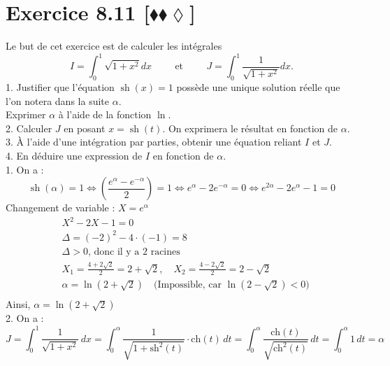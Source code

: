 \documentclass[10pt]{article}
\DeclareMathOperator{\sh}{sh}
\begin{document}
\section*{Exercice 8.11 [$\blacklozenge\blacklozenge\lozenge$]}
\begin{tcolorbox}[enhanced, width=7in, center, size=fbox, fontupper=\large, drop shadow southwest]
    Le but de cet exercice est de calculer les intégrales
    \begin{equation*}
        I = \int_0^1{\sqrt{1+x^2}dx} \hspace{1cm} \text{et} \hspace{1cm} J=\int_0^1{\frac{1}{\sqrt{1+x^2}}dx}.
    \end{equation*}
    1. Justifier que l'équation $\sh(x)=1$ possède une unique solution réelle que l'on notera dans la suite $\alpha$.\\
    Exprimer $\alpha$ à l'aide de la fonction $\ln$.\\
    2. Calculer $J$ en posant $x=\sh(t)$. On exprimera le résultat en fonction de $\alpha$.\\
    3. À l'aide d'une intégration par parties, obtenir une équation reliant $I$ et $J$.\\
    4. En déduire une expression de $I$ en fonction de $\alpha$.
    \\
    1. On a :
    \begin{equation*}
        \sh(\alpha) = 1 \iff \left( \frac{e^\alpha - e^{-\alpha}}{2} \right) = 1 \iff e^\alpha - 2e^{-\alpha} = 0 \iff e^{2\alpha} - 2e^\alpha - 1 = 0
    \end{equation*}
    Changement de variable : $X = e^\alpha$
    \begin{align*}
        &X^2 - 2X - 1 = 0 \\
        &\Delta = (-2)^2 - 4 \cdot (-1) = 8 \\
        &\Delta > 0 \text{, donc il y a 2 racines} \\
        &X_1 = \frac{4 + 2\sqrt{2}}{2} = 2 + \sqrt{2}, \quad X_2 = \frac{4 - 2\sqrt{2}}{2} = 2-\sqrt{2} \\
        &\alpha = \ln(2 + \sqrt{2}) \quad \text{(Impossible, car } \ln(2 - \sqrt{2}) < 0) \\
    \end{align*}
    Ainsi, $\alpha=\ln(2+\sqrt{2})$\\
    2. On a :
    \begin{equation*}
        J = \int_0^1 \frac{1}{\sqrt{1+x^2}} \, dx = \int_0^\alpha \frac{1}{\sqrt{1+\text{sh}^2(t)}} \cdot \text{ch}(t) \, dt = \int_0^\alpha \frac{\text{ch}(t)}{\sqrt{\text{ch}^2(t)}} \, dt = \int_0^\alpha 1 \, dt = \alpha

\end{equation*}
\end{tcolorbox}
\end{document}
